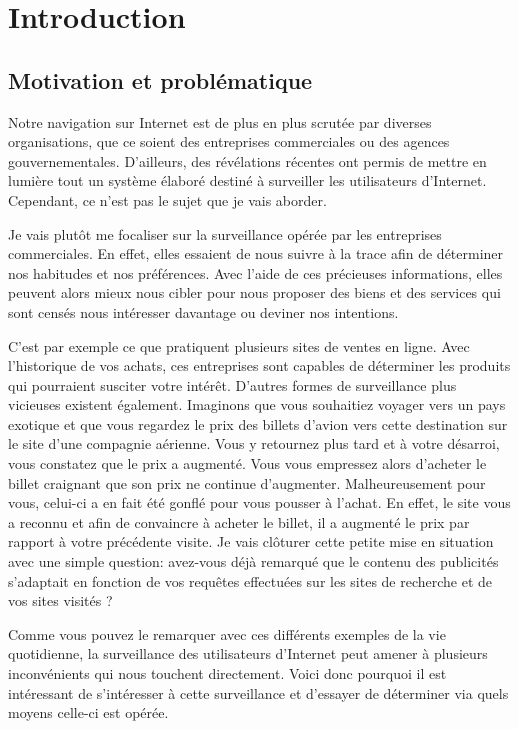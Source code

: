 \chapter{Introduction}
\section{Motivation et problématique}
Notre navigation sur Internet est de plus en plus scrutée par diverses organisations, que ce soient des entreprises commerciales ou des agences gouvernementales. D'ailleurs, des révélations récentes ont permis de mettre en lumière tout un système élaboré destiné à surveiller les utilisateurs d'Internet. Cependant, ce n'est pas le sujet que je vais aborder.

Je vais plutôt me focaliser sur la surveillance opérée par les entreprises commerciales. En effet, elles essaient de nous suivre à la trace afin de déterminer nos habitudes et nos préférences. Avec l'aide de ces précieuses informations, elles peuvent alors mieux nous cibler pour nous proposer des biens et des services qui sont censés nous intéresser davantage ou deviner nos intentions.

C'est par exemple ce que pratiquent plusieurs sites de ventes en ligne\cite{MD1}. Avec l'historique de vos achats, ces entreprises sont capables de déterminer les produits qui pourraient susciter votre intérêt. D'autres formes de surveillance plus vicieuses existent également. Imaginons que vous souhaitiez voyager vers un pays exotique et que vous regardez le prix des billets d'avion vers cette destination sur le site d'une compagnie aérienne. Vous y retournez plus tard et à votre désarroi, vous constatez que le prix a augmenté. Vous vous empressez alors d'acheter le billet craignant que son prix ne continue d'augmenter. Malheureusement pour vous, celui-ci a en fait été gonflé pour vous pousser à l'achat. En effet, le site vous a reconnu et afin de convaincre à acheter le billet, il a augmenté le prix par rapport à votre précédente visite. Je vais clôturer cette petite mise en situation avec une simple question: avez-vous déjà remarqué que le contenu des publicités s'adaptait en fonction de vos requêtes effectuées sur les sites de recherche et de vos sites visités ?

Comme vous pouvez le remarquer avec ces différents exemples de la vie quotidienne, la surveillance des utilisateurs d'Internet peut amener à plusieurs inconvénients qui nous touchent directement. Voici donc pourquoi il est intéressant de s'intéresser à cette surveillance et d'essayer de déterminer via quels moyens celle-ci est opérée.

